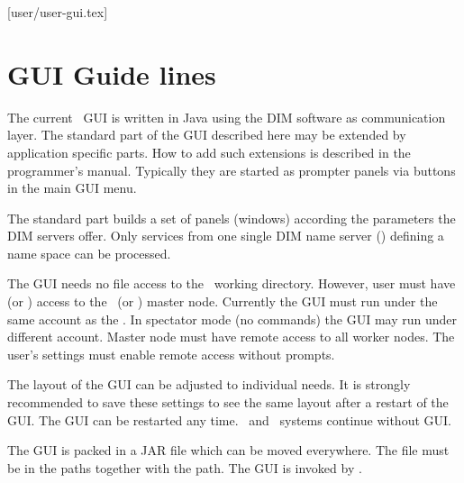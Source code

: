 [user/user-gui.tex]
\section{GUI Guide lines}
The current \dabc\ GUI is written in Java using the DIM software as communication layer.
The standard part of the GUI described here may be extended by application specific parts.
How to add such extensions is described in the programmer's manual.
Typically they are started as prompter panels via buttons in the
main GUI menu.

The standard part builds a set of panels (windows) according the parameters
the DIM servers offer. Only services from one single DIM name server
()
defining a name space can be processed.

The GUI needs no file access to the \dabc\ working directory.
However, user must have  (or ) access to
the \dabc\ (or \mbs) master node.
Currently the GUI must run under the same account as the \dabc.
In spectator mode (no commands) the GUI may run under different account.
Master node must have remote access to all worker nodes.
The user's  settings must enable remote access without
prompts.

The layout of the GUI can be adjusted to individual needs.
It is strongly recommended to save these settings to see the same layout
after a restart of the GUI. The GUI can be restarted any time.
\dabc\ and \mbs\ systems continue without GUI.

The GUI is packed in a JAR file  which can be moved everywhere. The file must be in the
 paths together with the  path.
The GUI is invoked by .
